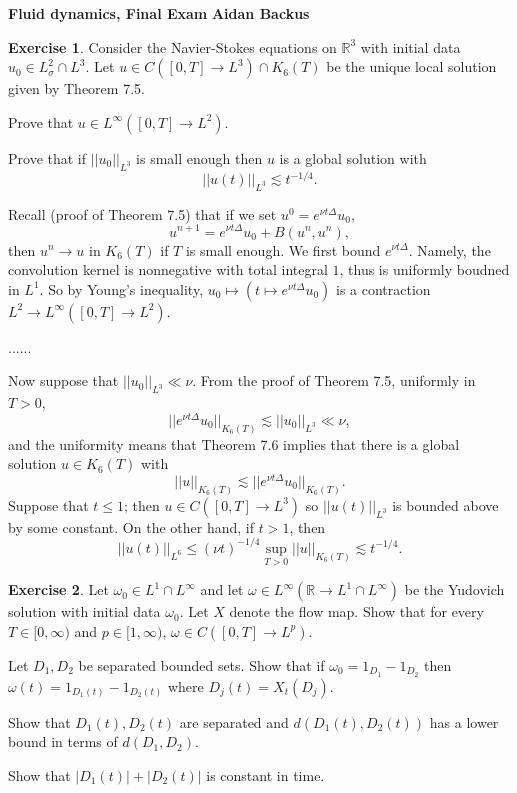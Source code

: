 \documentclass[10pt]{article}
\newcommand{\RR}{\mathbb{R}}
\theoremstyle{definition}
\newtheorem{exer}{Exercise}
\begin{document}
\noindent
\large\textbf{Fluid dynamics, Final Exam} \hfill \textbf{Aidan Backus} \\

\begin{exer}
Consider the Navier-Stokes equations on $\RR^3$ with initial data $u_0 \in L^2_\sigma \cap L^3$.
Let $u \in C([0, T] \to L^3) \cap K_6(T)$ be the unique local solution given by Theorem 7.5.

Prove that $u \in L^\infty([0, T] \to L^2)$.

Prove that if $||u_0||_{L^3}$ is small enough then $u$ is a global solution with
$$||u(t)||_{L^3} \lesssim t^{-1/4}.$$
\end{exer}

Recall (proof of Theorem 7.5) that if we set $u^0 = e^{\nu t\Delta} u_0$,
$$u^{n + 1} = e^{\nu t\Delta} u_0 + B(u^n, u^n),$$
then $u^n \to u$ in $K_6(T)$ if $T$ is small enough. We first bound $e^{\nu t\Delta}$. Namely, the convolution kernel is nonnegative with total integral $1$, thus is uniformly boudned in $L^1$.
So by Young's inequality, $u_0 \mapsto (t \mapsto e^{\nu t\Delta} u_0)$ is a contraction $L^2 \to L^\infty([0, T] \to L^2)$.

......


Now suppose that $||u_0||_{L^3} \ll \nu$.
From the proof of Theorem 7.5, uniformly in $T > 0$,
$$||e^{\nu t \Delta}u_0||_{K_6(T)} \lesssim ||u_0||_{L^3} \ll \nu,$$
and the uniformity means that Theorem 7.6 implies that there is a global solution $u \in K_6(T)$ with
$$||u||_{K_6(T)} \lesssim ||e^{\nu t \Delta}u_0||_{K_6(T)}.$$
Suppose that $t \leq 1$; then $u \in C([0, T] \to L^3)$ so $||u(t)||_{L^3}$ is bounded above by some constant.
On the other hand, if $t > 1$, then
$$||u(t)||_{L^6} \leq (\nu t)^{-1/4} \sup_{T > 0} ||u||_{K_6(T)} \lesssim t^{-1/4}.$$



\begin{exer}
Let $\omega_0 \in L^1 \cap L^\infty$ and let $\omega \in L^\infty(\RR \to L^1 \cap L^\infty)$ be the Yudovich solution with initial data $\omega_0$.
Let $X$ denote the flow map. Show that for every $T \in [0, \infty)$ and $p \in [1, \infty)$, $\omega \in C([0, T] \to L^p)$.

Let $D_1,D_2$ be separated bounded sets. Show that if $\omega_0 = 1_{D_1} - 1_{D_2}$ then $\omega(t) = 1_{D_1(t)} - 1_{D_2(t)}$ where $D_j(t) = X_t(D_j)$.

Show that $D_1(t),D_2(t)$ are separated and $d(D_1(t), D_2(t))$ has a lower bound in terms of $d(D_1, D_2)$.

Show that $|D_1(t)| + |D_2(t)|$ is constant in time.
\end{exer}
\end{document}
